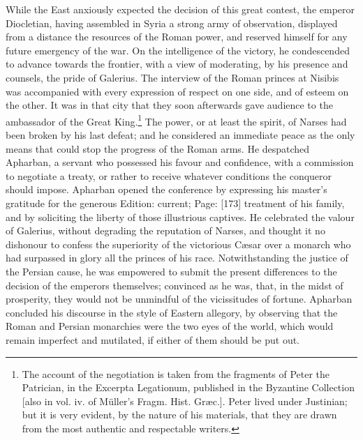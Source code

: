 While the East anxiously expected the decision of this great contest, the emperor Diocletian, having assembled in Syria a strong army of observation, displayed from a distance the resources of the Roman power, and reserved himself for any future emergency of the war. On the intelligence of the victory, he condescended to advance towards the frontier, with a view of moderating, by his presence and counsels, the pride of Galerius. The interview of the Roman princes at Nisibis was accompanied with every expression of respect on one side, and of esteem on the other. It was in that city that they soon afterwards gave audience to the ambassador of the Great King.\footnote{The account of the negotiation is taken from the fragments of Peter the Patrician, in the Excerpta Legationum, published in the Byzantine Collection [also in vol. iv. of Müller\texthebrew{}’s Fragm. Hist. Græc.]. Peter lived under Justinian; but it is very evident, by the nature of his materials, that they are drawn from the most authentic and respectable writers.} The power, or at least the spirit, of Narses had been broken by his last defeat; and he considered an immediate peace as the only means that could stop the progress of the Roman arms. He despatched Apharban, a servant who possessed his favour and confidence, with a commission to negotiate a treaty, or rather to receive whatever conditions the conqueror should impose. Apharban opened the conference by expressing his master\texthebrew{}’s gratitude for the generous Edition: current; Page: [173] treatment of his family, and by soliciting the liberty of those illustrious captives. He celebrated the valour of Galerius, without degrading the reputation of Narses, and thought it no dishonour to confess the superiority of the victorious Cæsar over a monarch who had surpassed in glory all the princes of his race. Notwithstanding the justice of the Persian cause, he was empowered to submit the present differences to the decision of the emperors themselves; convinced as he was, that, in the midst of prosperity, they would not be unmindful of the vicissitudes of fortune. Apharban concluded his discourse in the style of Eastern allegory, by observing that the Roman and Persian monarchies were the two eyes of the world, which would remain imperfect and mutilated, if either of them should be put out.

